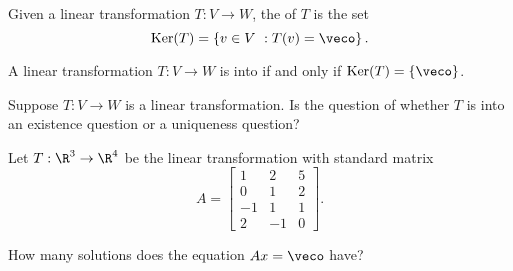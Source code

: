 \endedxvertical








\endedxvertical






{}  
Given a linear transformation $T: V\rightarrow W$, the  {} of $T$ is the set
\[ \mathrm{Ker}(T) =  \left\{ v\in V \ : T(v) = \veco \right\}. \] 

{}  
A linear transformation $T: V \rightarrow W$ is into if and only if $\mathrm{Ker}(T) = \{ \veco \}$.  

\endedxtext





Suppose $T: V\rightarrow W$ is a linear transformation.  Is the question 
of whether $T$ is into an existence question or a uniqueness question?



\endedxproblem





Let $T: \R^3 \rightarrow \R^4$ be the linear transformation with standard matrix 
\[ A = \left[\begin{array}{ccc} 1 & 2 & 5 \\ 0 & 1 & 2 \\ -1 & 1 & 1 \\ 2 & -1 & 0 \end{array} \right]. \]

How many solutions does the equation $Ax = \veco$ have?



